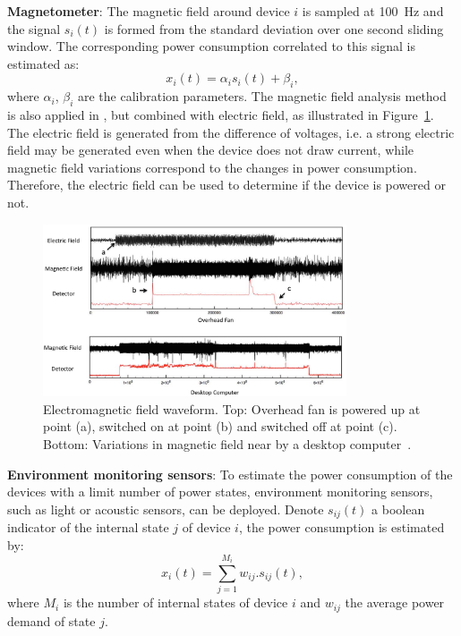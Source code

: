 \textbf{Magnetometer}: The magnetic field around device $i$ is sampled at 100~Hz and the signal $s_i(t)$ is formed from the standard deviation over one second sliding window. The corresponding power consumption correlated to this signal is estimated as:
\begin{equation}\label{eqA1}
x_i(t) = \alpha_i s_i(t)+\beta_i,
\end{equation}
where $\alpha_i$, $\beta_i$ are the calibration parameters. The magnetic field analysis method is also applied in \cite{Rowe2010}, but combined with electric field, as illustrated in Figure~\ref{fig:A1}. The electric field is generated from the difference of voltages, i.e. a strong electric field may be generated even when the device does not draw current, while magnetic field variations correspond to the changes in power consumption. Therefore, the electric field can be used to determine if the device is powered or not.

\begin{figure}
\centering
\includegraphics[width=0.8\textwidth]{./chapters/chapter2/images/EMFdetector.pdf} 
\caption{Electromagnetic field waveform. Top: Overhead fan is powered up at point (a), switched on at point (b) and switched off at point (c). Bottom: Variations in magnetic field near by a desktop computer~\cite{Rowe2010}.} 
\label{fig:A1} 
\end{figure}

\textbf{Environment monitoring sensors}: To estimate the power consumption of the devices with a limit number of power states, environment monitoring sensors, such as light or acoustic sensors, can be deployed. Denote $s_{ij}(t)$ a boolean indicator of the internal state $j$ of device $i$, the power consumption is estimated by:
\begin{equation}\label{eqA2}
x_i(t) = \sum_{j=1}^{M_i}{w_{ij}.s_{ij}(t)},
\end{equation}
where $M_i$ is the number of internal states of  device $i$ and $w_{ij}$  the average power demand of state $j$.

